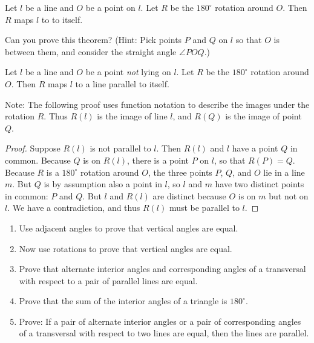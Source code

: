 \begin{theorem}
Let $l$ be a line and $O$ be a point on $l$. Let $R$ be the $180^\circ$
rotation around $O$. Then $R$ maps $l$ to to itself.  
\end{theorem}

\begin{question}
Can you prove this theorem?  
(Hint:  Pick points $P$ and $Q$ on $l$ so that $O$ is between them, and consider the straight angle $\angle POQ$.)
\end{question}
\QM

\begin{theorem}
Let $l$ be a line and $O$ be a point \emph{not} lying on $l$. Let $R$ be the $180^\circ$
rotation around $O$. Then $R$ maps $l$ to a line parallel to itself. 
\end{theorem}

Note:  The following proof uses function notation to describe the images under the rotation $R$.  Thus $R(l)$ is the image of line $l$, and $R(Q)$ is the image of point $Q$.  

\begin{proof}
Suppose $R(l)$ is not parallel to $l$.  Then $R(l)$ and $l$ have a point $Q$ in common.  Because $Q$ is on $R(l)$, there is a point $P$ on $l$, 
so that $R(P) = Q$. Because $R$ is a $180^\circ$ rotation around $O$, the three points $P$, $Q$, and $O$ lie in a line $m$. But
$Q$ is by assumption also a point in $l$, so $l$ and $m$  have two distinct points in common: $P$ and $Q$. 
But $l$ and $R(l)$ are distinct because $O$ is on $m$ but not on $l$. We have a contradiction, and thus $R(l)$ must be parallel to $l$.  
\end{proof}

%
%
%


\begin{problems}
\begin{enumerate}
\item Use adjacent angles to prove that vertical angles are equal.    
\item Now use rotations to prove that vertical angles are equal.

\item Prove that alternate interior angles and corresponding angles of a transversal with respect to a pair of parallel lines are equal.
\item Prove that the sum of the interior angles of a triangle is $180^\circ$.
\item Prove: If a pair of alternate interior angles or a pair of corresponding angles of a transversal with respect to two lines are equal, then the lines are parallel.
\end{enumerate}
\end{problems}


